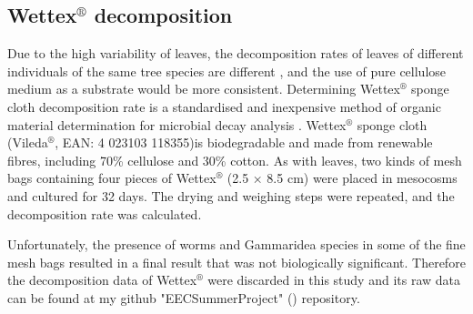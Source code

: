 \subsection{Wettex$^\circledR$ decomposition}\label{section:Wettex}

Due to the high variability of leaves, the decomposition rates of leaves of different individuals of the same tree species are different \citep{irons1991effects,sariyildiz2003decomposition,coleman2020leaf}, and the use of pure cellulose medium as a substrate would be more consistent. Determining Wettex$^\circledR$ sponge cloth decomposition rate is a standardised and inexpensive method of organic material determination for microbial decay analysis \citep{eriksen2022effects}. Wettex$^\circledR$ sponge cloth (Vileda$^\circledR$, EAN: 4 023103 118355)is biodegradable and made from renewable fibres, including 70\% cellulose and 30\% cotton. As with leaves, two kinds of mesh bags containing four pieces of Wettex$^\circledR$ (2.5 × 8.5 cm) were placed in mesocosms and cultured for 32 days. The drying and weighing steps were repeated, and the decomposition rate was calculated.

Unfortunately, the presence of worms and Gammaridea species in some of the fine mesh bags resulted in a final result that was not biologically significant. Therefore the decomposition data of Wettex$^\circledR$ were discarded in this study and its raw data can be found at my github "EECSummerProject"  (\href{https://github.com/ChuxuanJi/EECSummerProject/tree/master/Sandbox}{}) repository.

